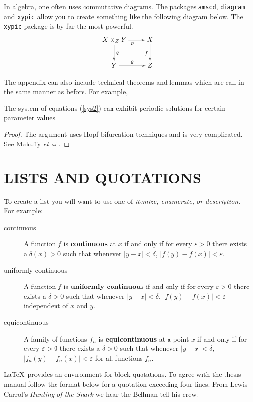 In algebra, one often uses commutative diagrams.  The packages
{\tt amscd}, {\tt diagram} and {\tt xypic} allow you to create
something like the following diagram below.
The {\tt xypic} package is by far the most powerful.
\begin{equation}
\xymatrix{
 X \times_Z Y \ar[d]^q \ar[r]_p & X \ar[d]_f       \\ 
 Y \ar[r]^g   & Z  
}
\end{equation}


The appendix can also include technical theorems and lemmas which are
call in the same manner as before. For example,
\begin{theorem}
The system of equations {\rm (\ref{sys2})} can exhibit periodic
solutions for certain parameter values.
\end{theorem}

\begin{proof}
The argument uses Hopf bifurcation techniques and is very
complicated. See Mahaffy {\it et al} \cite{MJV}.
\end{proof}

\chapter{LISTS AND QUOTATIONS}

To create a list you will want to use one of {\it itemize, enumerate, or
description}. For example:
\begin{description}
\item[continuous] A function $f$ is {\bf continuous} at $x$ if and only
if for every $\varepsilon >0$ there exists a $\delta(x) >0$ such that
whenever $|y-x|<\delta$, $|f(y)-f(x)| < \varepsilon$.
\item[uniformly continuous] A function $f$ is {\bf uniformly
continuous} if and only if for every $\varepsilon >0$ there exists a
$\delta >0$ such that whenever $|y-x|<\delta$, $|f(y)-f(x)| <
\varepsilon$ independent of $x$ and $y$.
\item[equicontinuous] A family of functions $f_n$ is {\bf
equicontinuous} at a point $x$ if and only if for every $\varepsilon >0$
there exists a $\delta >0$ such that whenever $|y-x|<\delta$,
$|f_n(y)-f_n(x)| < \varepsilon$ for all functions $f_n$.
\end{description}

\LaTeX\ provides an environment for block quotations. To agree with the
thesis manual follow the format below for a quotation exceeding four
lines. From Lewis Carrol's {\it Hunting of the Snark} we hear the
Bellman tell his crew:
 \vspace{.12pt}

